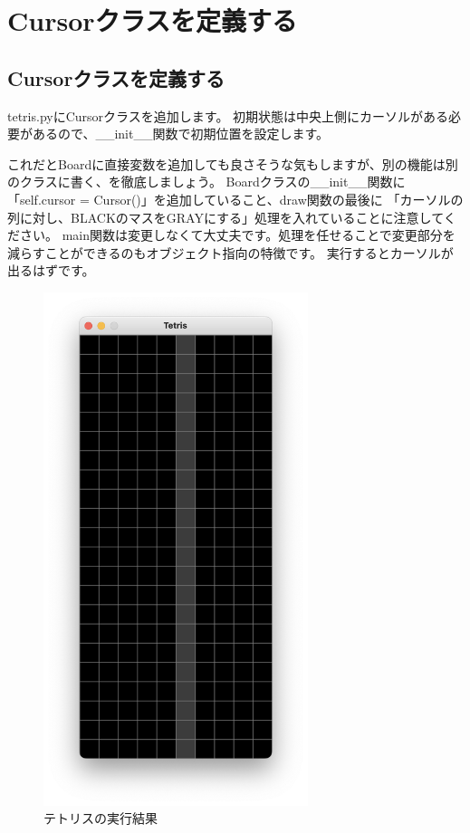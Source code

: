 \documentclass[12pt, a4paper, dvipdfmx]{book}
\begin{document}
\section{Cursorクラスを定義する}
\subsection{Cursorクラスを定義する}
tetris.pyにCursorクラスを追加します。
初期状態は中央上側にカーソルがある必要があるので、\_\_init\_\_関数で初期位置を設定します。

これだとBoardに直接変数を追加しても良さそうな気もしますが、別の機能は別のクラスに書く、を徹底しましょう。
Boardクラスの\_\_init\_\_関数に「self.cursor = Cursor()」を追加していること、draw関数の最後に
「カーソルの列に対し、BLACKのマスをGRAYにする」処理を入れていることに注意してください。
main関数は変更しなくて大丈夫です。処理を任せることで変更部分を減らすことができるのもオブジェクト指向の特徴です。
実行するとカーソルが出るはずです。

\begin{figure}
  \centering
  \includegraphics[height=15cm, natwidth=824,natheight=1600]{TetrisCH5.png}
  \caption{テトリスの実行結果}
\end{figure}
\end{document}
